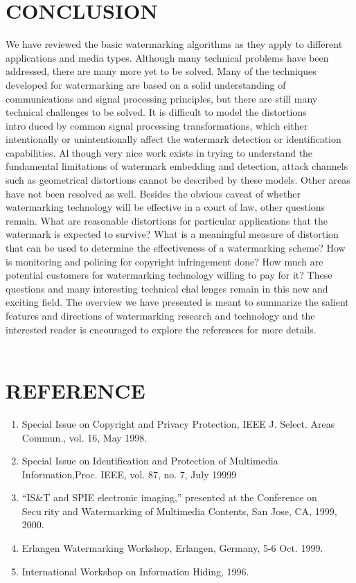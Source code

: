 \documentclass[12pt]{IEeetran}
\begin{document}
\section{CONCLUSION}
 We have reviewed the basic watermarking algorithms as
they apply to different applications and media types. Although many technical problems have been addressed,
there are many more yet to be solved. Many of the techniques developed for watermarking are based on a solid
understanding of communications and signal processing
principles, but there are still many technical challenges to
be solved. It is difficult to model the distortions intro￾duced by common signal processing transformations,
which either intentionally or unintentionally affect the
watermark detection or identification capabilities. Al￾though very nice work exists in trying to understand the
fundamental limitations of watermark embedding and
detection, attack channels such as geometrical distortions
cannot be described by these models. Other areas have
not been resolved as well. Besides the obvious caveat of
whether watermarking technology will be effective in a
court of law, other questions remain. What are reasonable
distortions for particular applications that the watermark
is expected to survive? What is a meaningful measure of
distortion that can be used to determine the effectiveness
of a watermarking scheme? How is monitoring and policing for copyright infringement done? How much are potential customers for watermarking technology willing to
pay for it?
These questions and many interesting technical chal￾lenges remain in this new and exciting field. The overview
we have presented is meant to summarize the salient features and directions of watermarking research and technology and the interested reader is encouraged to explore
the references for more details.\\ \\
\section{REFERENCE}
\begin{enumerate}
\item Special Issue on Copyright and Privacy Protection, IEEE J. Select. Areas Commun., vol. 16, May 1998.\\
\item Special Issue on Identification and Protection of Multimedia Information,Proc. IEEE, vol. 87, no. 7, July 19999\\
\item “IS&T and SPIE electronic imaging,” presented at the Conference on Secu￾rity and Watermarking of Multimedia Contents, San Jose, CA, 1999, 2000.\\
\item Erlangen Watermarking Workshop, Erlangen, Germany, 5-6 Oct. 1999.\\
\item International Workshop on Information Hiding, 1996.
\end{enumerate}
\end{document}
